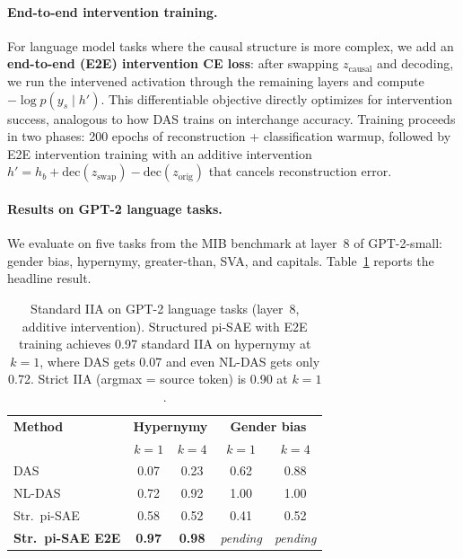 \documentclass{article}
\begin{document}
\paragraph{End-to-end intervention training.}
For language model tasks where the causal structure is more complex, we add an
\textbf{end-to-end (E2E) intervention CE loss}: after swapping $z_\text{causal}$
and decoding, we run the intervened activation through the remaining layers and
compute $-\log p(y_s \mid h')$. This differentiable objective directly
optimizes for intervention success, analogous to how DAS trains on interchange
accuracy. Training proceeds in two phases: 200 epochs of reconstruction +
classification warmup, followed by E2E intervention training with an additive
intervention $h' = h_b + \text{dec}(z_\text{swap}) - \text{dec}(z_\text{orig})$
that cancels reconstruction error.

\paragraph{Results on GPT-2 language tasks.}
We evaluate on five tasks from the MIB benchmark \citep{prakash2024mib} at
layer~8 of GPT-2-small: gender bias, hypernymy, greater-than, SVA, and
capitals. Table~\ref{tab:nlp_results} reports the headline result.

\begin{table}[t]
\centering
\small
\setlength{\tabcolsep}{4pt}
\begin{tabular}{lcccc}
\toprule
\textbf{Method} & \multicolumn{2}{c}{\textbf{Hypernymy}} & \multicolumn{2}{c}{\textbf{Gender bias}} \\
& $k{=}1$ & $k{=}4$ & $k{=}1$ & $k{=}4$ \\
\midrule
DAS              & 0.07 & 0.23 & 0.62 & 0.88 \\
NL-DAS           & 0.72 & 0.92 & 1.00 & 1.00 \\
Str.\ pi-SAE     & 0.58 & 0.52 & 0.41 & 0.52 \\
\textbf{Str.\ pi-SAE E2E} & \textbf{0.97} & \textbf{0.98} & \textit{pending} & \textit{pending} \\
\bottomrule
\end{tabular}
\caption{Standard IIA on GPT-2 language tasks (layer~8, additive intervention).
Structured pi-SAE with E2E training achieves 0.97 standard IIA on hypernymy at
$k{=}1$, where DAS gets 0.07 and even NL-DAS gets only 0.72. Strict IIA
(argmax = source token) is 0.90 at $k{=}1$.}
\label{tab:nlp_results}
\end{table}
\end{document}
